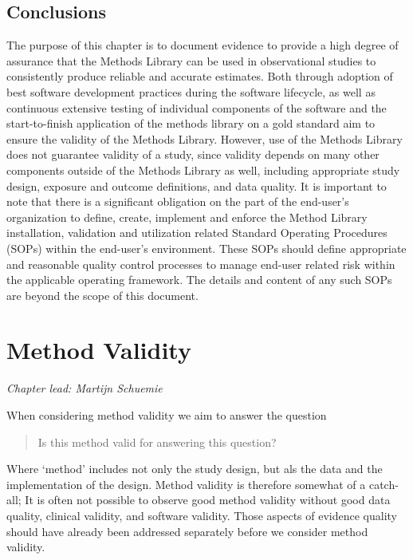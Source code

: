\documentclass[]{book}
\begin{document}
\section{Conclusions}\label{conclusions}

The purpose of this chapter is to document evidence to provide a high
degree of assurance that the Methods Library can be used in
observational studies to consistently produce reliable and accurate
estimates. Both through adoption of best software development practices
during the software lifecycle, as well as continuous extensive testing
of individual components of the software and the start-to-finish
application of the methods library on a gold standard aim to ensure the
validity of the Methods Library. However, use of the Methods Library
does not guarantee validity of a study, since validity depends on many
other components outside of the Methods Library as well, including
appropriate study design, exposure and outcome definitions, and data
quality. It is important to note that there is a significant obligation
on the part of the end-user's organization to define, create, implement
and enforce the Method Library installation, validation and utilization
related Standard Operating Procedures (SOPs) within the end-user's
environment. These SOPs should define appropriate and reasonable quality
control processes to manage end-user related risk within the applicable
operating framework. The details and content of any such SOPs are beyond
the scope of this document.

\chapter{Method Validity}\label{MethodValidity}

\emph{Chapter lead: Martijn Schuemie}

When considering method validity we aim to answer the question

\begin{quote}
Is this method valid for answering this question?
\end{quote}

Where `method' includes not only the study design, but als the data and
the implementation of the design. Method validity is therefore somewhat
of a catch-all; It is often not possible to observe good method validity
without good data quality, clinical validity, and software validity.
Those aspects of evidence quality should have already been addressed
separately before we consider method validity.
\end{document}
